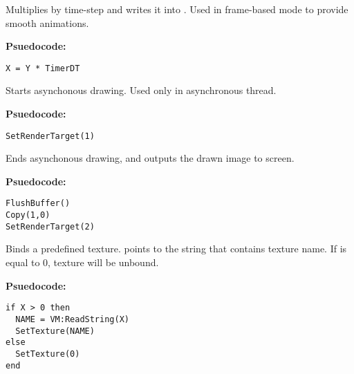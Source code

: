Multiplies  by time-step and writes it into . Used in frame-based mode to provide smooth animations.

\textbf{Psuedocode:}
\begin{verbatim}
X = Y * TimerDT
\end{verbatim}


%


Starts asynchonous drawing. Used only in asynchronous thread.

\textbf{Psuedocode:}
\begin{verbatim}
SetRenderTarget(1)
\end{verbatim}


Ends asynchonous drawing, and outputs the drawn image to screen.

\textbf{Psuedocode:}
\begin{verbatim}
FlushBuffer()
Copy(1,0)
SetRenderTarget(2)
\end{verbatim}


%


%


%


Binds a predefined texture.  points to the string that contains texture name. If  is equal to 0, texture will be unbound.

\textbf{Psuedocode:}
\begin{verbatim}
if X > 0 then
  NAME = VM:ReadString(X)
  SetTexture(NAME)
else
  SetTexture(0)
end
\end{verbatim}